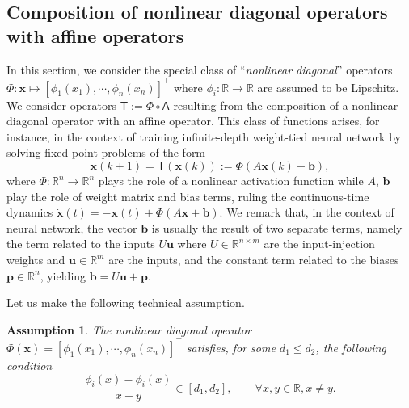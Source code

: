 \documentclass[journal,twoside,web]{ieeecolor}
\newcommand{\virg}[1]{``#1''}
\newcommand{\rea }{\mathbb{R}}
\newcommand{\nat}{\mathbb{N}}
\newcommand{\ub}{\boldsymbol{u}}
\newcommand{\xb}{\boldsymbol{x}}
\newcommand{\pb}{\boldsymbol{p}}
\newcommand{\bb}{\boldsymbol{b}}
\newcommand{\Ts}{\mathsf{T}}
\newcommand{\As}{\mathsf{A}}
\newcommand{\Lip}{\mathsf{Lip}}
\newtheorem{assum}{Assumption}
\begin{document}



\subsection{Composition of nonlinear diagonal operators with affine operators}\label{sec:dnl}
%
In this section, we consider the special class of \virg{\textit{nonlinear diagonal}} operators ${\Phi:\xb\mapsto[\phi_1(x_1),\cdots,\phi_n(x_n)]^\top}$ where $\phi_i:\rea\rightarrow\rea$ are assumed to be Lipschitz.
%
%
We consider operators $\Ts:=\Phi\circ\As$ resulting from the composition of a nonlinear diagonal operator with an affine operator.
%
This class of functions arises, for instance, in the context of training infinite-depth weight-tied neural network \cite{winston2020monotone,li2021training,Jafarpour21} by solving fixed-point problems of the form
%
\begin{equation}\label{eq:fpp}
\xb(k+1) = \Ts(\xb(k)) := \Phi(A\xb(k) + \bb),
\end{equation}
%
where ${\Phi:\rea^n\rightarrow \rea^n}$ plays the role of a nonlinear activation function while $A$, $\bb$ play the role of weight matrix and bias terms, ruling the continuous-time dynamics
%
$
{\dot{\xb}(t) = -\xb(t)+\Phi(A\xb+\bb)}.
$
%
We remark that, in the context of neural network, the vector $\bb$ is usually the result of two separate terms, namely the term related to the inputs $U\ub$ where $U\in\mathbb{R}^{n\times m}$ are the input-injection weights and $\ub\in\rea^m$ are the inputs, and the constant term related to the biases $\pb\in\rea^n$, yielding $\bb=U\ub+\pb$. 

Let us make the following technical assumption.
%
\begin{assum}\label{ass:actfun}
 The nonlinear diagonal operator ${\Phi(\xb)=[\phi_1(x_1),\cdots,\phi_n(x_n)]^\top}$ satisfies, for some $d_1\leq d_2$, the following condition
 $$
\frac{\phi_i(x)-\phi_i(x)}{x-y}\in[d_1,d_2],\qquad \forall x,y\in\rea,x\neq y.
 $$
\end{assum}
\end{document}
